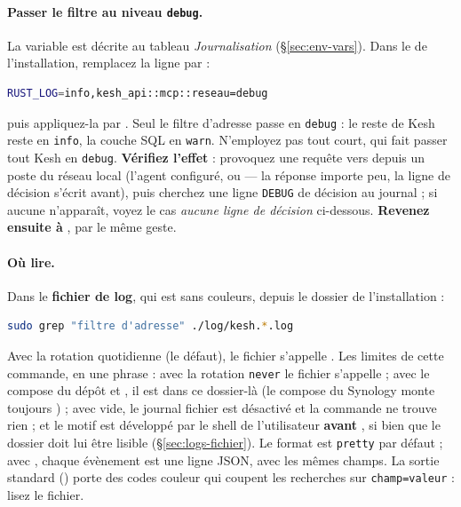 \documentclass[a4paper,11pt,oneside]{article}
\begin{document}
\paragraph{Passer le filtre au niveau \texttt{debug}.} La variable  est décrite au tableau \emph{Journalisation} (\S\ref{sec:env-vars}). Dans le  de l'installation, remplacez la ligne  par :

\begin{lstlisting}[language=bash]
RUST_LOG=info,kesh_api::mcp::reseau=debug
\end{lstlisting}

puis appliquez-la par . Seul le filtre d'adresse passe en \texttt{debug} : le reste de Kesh reste en \texttt{info}, la couche SQL en \texttt{warn}. N'employez pas  tout court, qui fait passer tout Kesh en \texttt{debug}. \textbf{Vérifiez l'effet} : provoquez une requête vers  depuis un poste du réseau local (l'agent configuré, ou  --- la réponse importe peu, la ligne de décision s'écrit avant), puis cherchez une ligne \texttt{DEBUG} de décision au journal ; si aucune n'apparaît, voyez le cas \emph{aucune ligne de décision} ci-dessous. \textbf{Revenez ensuite à} , par le même geste.

\paragraph{Où lire.} Dans le \textbf{fichier de log}, qui est sans couleurs, depuis le dossier de l'installation :

\begin{lstlisting}[language=bash]
sudo grep "filtre d'adresse" ./log/kesh.*.log
\end{lstlisting}

Avec la rotation quotidienne (le défaut), le fichier s'appelle . Les limites de cette commande, en une phrase : avec la rotation \texttt{never} le fichier s'appelle  ; avec le compose  du dépôt et , il est dans ce dossier-là (le compose du Synology monte toujours ) ; avec  vide, le journal fichier est désactivé et la commande ne trouve rien ; et le motif  est développé par le shell de l'utilisateur \textbf{avant} , si bien que le dossier  doit lui être lisible (\S\ref{sec:logs-fichier}). Le format est \texttt{pretty} par défaut ; avec , chaque évènement est une ligne JSON, avec les mêmes champs. La sortie standard () porte des codes couleur qui coupent les recherches sur \texttt{champ=valeur} : lisez le fichier.
\end{document}
